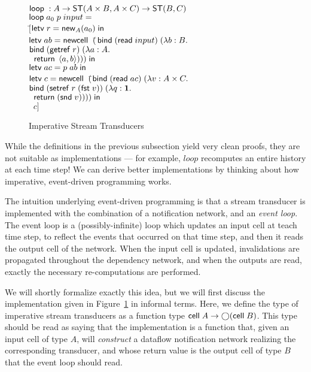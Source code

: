 \begin{figure}
\begin{tabbing}
$\mathsf{loop}\; : A \to \mathsf{ST}({A\times B}, {A\times C}) \to \mathsf{ST}({B}, {C})$ \\
$\mathsf{loop}\; a_0\; p \; input = $ \\
\;\;$[$\=$\mathsf{letv}\;r = \mathsf{new}_{A}(a_0)\;\mathsf{in}\;$ \\
    \>$\mathsf{letv}\; ab = \mathsf{newcell}\;\; ($\=$\mathsf{bind}\; (\mathsf{read}\; input)\; (\lambda b:B.$ \\
    \>                                \>$\mathsf{bind}\; (\mathsf{getref}\; r)\;       (\lambda a:A.$ \\
    \>                                \>$\;\; \mathsf{return}\; \left<{a},{b}\right>))) \;\mathsf{in}$ \\
    \>$\mathsf{letv}\;ac = p\;ab\;\mathsf{in}\;$ \\
    \>$\mathsf{letv}\;c = \mathsf{newcell}\;\; ($\=$\mathsf{bind}\; (\mathsf{read}\; ac) \;(\lambda v:A \times C.$ \\
    \>                              \>$\mathsf{bind}\; (\mathsf{setref}\; r\;(\mathsf{fst}\; v)) \;(\lambda q:\mathbf{1}.$ \\
    \>                              \>$\;\;\mathsf{return}\; (\mathsf{snd}\; v))))\;\mathsf{in}$ \\
    \>$\;\;c]$ 
\end{tabbing}
\caption{Imperative Stream Transducers}
\label{imperative-transducer-semantics}
\end{figure}

While the definitions in the previous subsection yield very clean
proofs, they are not suitable as implementations --- for example,
$loop$ recomputes an entire history at each time step! We can derive
better implementations by thinking about how imperative, event-driven
programming works.

The intuition underlying event-driven programming is that a stream
transducer is implemented with the combination of a notification
network, and an \emph{event loop}.  The event loop is a
(possibly-infinite) loop which updates an input cell at teach time
step, to reflect the events that occurred on that time step, and then
it reads the output cell of the network. When the input cell is
updated, invalidations are propagated throughout the dependency
network, and when the outputs are read, exactly the necessary
re-computations are performed.

We will shortly formalize exactly this idea, but we will first discuss
the implementation given in
Figure~\ref{imperative-transducer-semantics} in informal terms. Here,
we define the type of imperative stream transducers as a function type
$\mathsf{cell}\;{A} \to \bigcirc{(\mathsf{cell}\;{B})}$. This type should be read as
saying that the implementation is a function that, given an input cell
of type $A$, will \emph{construct} a dataflow notification network
realizing the corresponding transducer, and whose return value is the
output cell of type $B$ that the event loop should read. 

